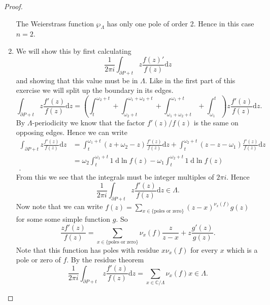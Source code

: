 \documentclass[a4paper]{article}
\theoremstyle{theoremdd}
\theoremstyle{definitiondd}
\theoremstyle{remarkdd}
\newcommand{\C}{\mathbb{C}}
\begin{document}
\begin{proof}
\begin{enumerate}
The Weierstrass function $\wp_{\Lambda}$ has only one pole of order 2. Hence in this case  $n = 2$.
\item 
	We will show this by first calculating \[
		\frac{1}{2\pi i}\int_{\partial P + t} z \frac{f(z)'}{f(z)} \mathrm d z
	\]
	and showing that this value must be in $\Lambda$.
	Like in the first part of this exercise we will split up the boundary in its edges.
	\[	
		\int_{\partial P+ t} z \frac{f'(z)}{f(z)} \mathrm d z = \left(\int_t^{\omega_2 + t} + \int_{\omega_2+t}^{\omega_1 + \omega_2 + t} + \int_{\omega_1 + \omega_2 + t} ^{\omega_1 + t} + \int_{\omega_1}^{t}\right) z \frac{f'(z)}{f(z)} \mathrm dz
	.\]
	By $\Lambda$-periodicity we know that the factor $f'(z) / f(z)$ is the same on opposing edges. Hence we can write \begin{align*}
		\int_{\partial P + t} z \frac{f'(z)}{f(z)} \mathrm d z &= \int_t^{\omega_1 + t} (z + \omega_2 - z) \frac{f'(z)}{f(z)} \mathrm d z + \int_{t}^{\omega_2 + t} (z - z - \omega_1) \frac{f'(z)}{f(z)} \mathrm d z\\
								       &= \omega_2 \int_t^{\omega_1 + t} 1 \; \mathrm d \ln f(z) - \omega_1 \int_t^{\omega_2 +t} 1 \; \mathrm d \ln f(z) \\
	.\end{align*} 
	From this we see that the integrals must be integer multiples of  $2\pi i$. 
	Hence 
	\[
		\frac{1}{2\pi i } \int_{\partial P + t} z \frac{f'(z)}{f(z)} \mathrm d z \in \Lambda
	.\] 
	Now note that we can write $f(z) = \sum_{x \in \{\text{poles or zero}\} }(z - x)^{\nu_x(f)}g(z)$ for some some simple function $g$. 
	So \[
		\frac{zf'(z)}{f(z)} = \sum_{x \in \{\text{poles or zero}\} }\nu_x(f) \frac{z}{ z - x} + z \frac{g'(z)}{g(z)}
	.\] 
	Note that this function has poles with residue $x \nu_x(f)$ for every $x$ which is a pole or zero of  $f$. By the residue theorem  \[
		\frac{1}{2\pi i} \int_{\partial P + t} z \frac{f'(z)}{f(z)} \mathrm d z = \sum_{x \in \C / \Lambda} \nu_x(f)  x \in \Lambda 
	.\]  
\end{enumerate}
\end{proof}
\printbibliography
\end{document}
